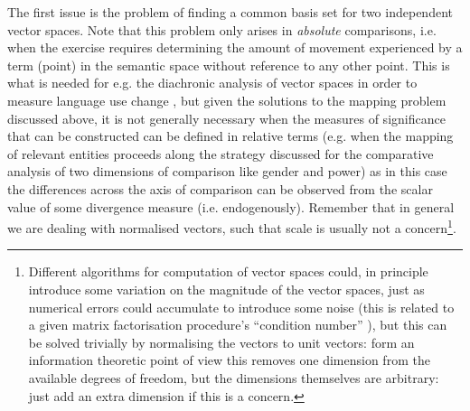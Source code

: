 The first issue is the problem of finding a common basis set for two independent vector spaces.
Note that this problem only arises in \emph{absolute} comparisons, i.e. when the exercise requires determining the amount of movement experienced by a term (point) in the semantic space without reference to any other point.
This is what is needed for e.g. the diachronic analysis of vector spaces in order to measure language use change \citep{hamilton2016}, but given the solutions to the mapping problem discussed above, it is not generally necessary when the measures of significance that can be constructed can be defined in relative terms (e.g. when the mapping of relevant entities proceeds along the strategy discussed for the comparative analysis of two dimensions of comparison like gender and power) as in this case the differences across the axis of comparison can be observed from the scalar value of some divergence measure (i.e. endogenously).
Remember that in general we are dealing with normalised vectors, such that scale is usually not a concern\footnote{
    Different algorithms for computation of vector spaces could, in principle introduce some variation on the magnitude of the vector spaces, just as numerical errors could accumulate to introduce some noise (this is related to a given matrix factorisation procedure's ``condition number'' \citep[ch. 1] {golub2012}), but this can be solved trivially by normalising the vectors to unit vectors: form an information theoretic point of view this removes one dimension from the available degrees of freedom, but the dimensions themselves are arbitrary: just add an extra dimension if this is a concern.
}.


